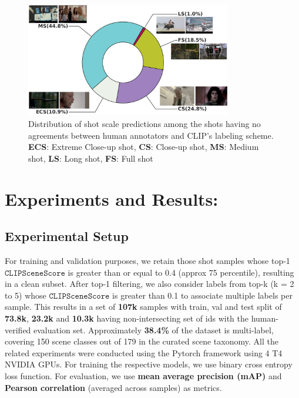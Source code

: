 \begin{figure}[h!]
    \centering
    \includegraphics[width=0.8\textwidth]{figures/Shot_type_distribution_discarded_shots.png}
    \caption{Distribution of shot scale predictions among the shots having no agreements between human annotators and CLIP's labeling scheme. \textbf{ECS}: Extreme Close-up shot, \textbf{CS}: Close-up shot, \textbf{MS}: Medium shot, \textbf{LS}: Long shot, \textbf{FS}: Full shot}
    \label{shot_type_distribution}
\end{figure}

\section{Experiments and Results:}

\subsection{Experimental Setup}
For training and validation purposes, we retain those shot samples whose top-1 $\texttt{CLIPSceneScore}$ is greater than or equal to 0.4 (approx 75 percentile), resulting in a clean subset. After top-1 filtering, we also consider labels from top-k (k = 2 to 5) whose $\texttt{CLIPSceneScore}$ is greater than 0.1 to associate multiple labels per sample.
This results in a set of \textbf{107k} samples with train, val and test split of \textbf{73.8k}, \textbf{23.2k} and \textbf{10.3k} having non-intersecting set of ids with the human-verified evaluation set. Approximately \textbf{38.4\%} of the dataset is multi-label, covering 150 scene classes out of 179 in the curated scene taxonomy. 
All the related experiments were conducted using the Pytorch\cite{Pytorch} framework using 4 T4 NVIDIA GPUs. For training the respective models, we use binary cross entropy loss function. For evaluation, we use \textbf{mean average precision (mAP)} and \textbf{Pearson correlation} (averaged across samples) as metrics.


